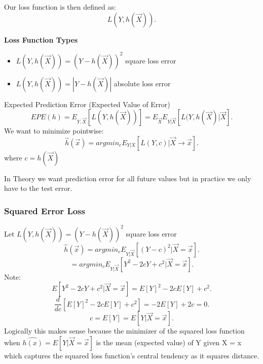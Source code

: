 \documentclass[a4paper]{article}
\begin{document}
  \begin{definition}
    Our loss function is then defined as:
    \[
      L(Y, h(\vec{X}))
    .\] 
  \end{definition}
  
  \textbf{Loss Function Types}
  \begin{itemize}
    \item $L(Y, h(\vec{X})) = (Y - h(\vec{X}))^2$ square loss error
    \item $L(Y, h(\vec{X})) = |Y - h(\vec{X})|$ absolute loss error
  \end{itemize}
  
  \begin{definition}
  Expected Prediction Error (Expected Value of Error)
    \[
      EPE(h) = E_{Y, \vec{X}} [L(Y, h(\vec{X}))] = E_{\vec{X}} E_{Y | \vec{X}} [L(Y, h(\vec{X}) | \vec{X}]
    .\]
    We want to minimize pointwise:
  \[
    \hat{h}(\vec{x}) = argmin_c E_{Y | X} [L(Y, c) | \vec{X} \to \vec{x} ] 
  .\]
  where $c = h(\vec{X})$
  \end{definition}

  \begin{remark}
    In Theory we want prediction error for all future values but in practice we only have to the test error.
  \end{remark}

  \subsubsection{Squared Error Loss}
  Let  $L(Y, h(\vec{X})) = (Y - h(\vec{X}))^2$ square loss error
  \[
    \hat{h}(\vec{x}) = argmin_c E_{Y | \vec{X}} [(Y - c)^2 | \vec{X} = \vec{x}]
  .\] 
  \[
    = argmin_c E_{Y | \vec{X}} [Y^2 - 2cY + c^2 | \vec{X} = \vec{x}] 
  .\]
  Note:
  \[
    E[Y^2 - 2cY + c^2 | \vec{X} = \vec{x}] = E[Y]^2 - 2cE[Y] + c^2  
  .\] 
  \[
  \frac{d}{dc}[E[Y]^2 - 2cE[Y] + c^2] = -2E[Y] + 2c = 0
  .\] 
  \[
    c = E[Y] = E[Y | \vec{X} = \vec{x}]
  .\]
  Logically this makes sense because the minimizer of the squared loss function when $\hat{h(x)}=E[Y|\vec{X} = \vec{x}]$ 
  is the mean (expected value) of Y given X = x which captures the squared loss function's central
  tendency as it squares distance. 
\end{document}
